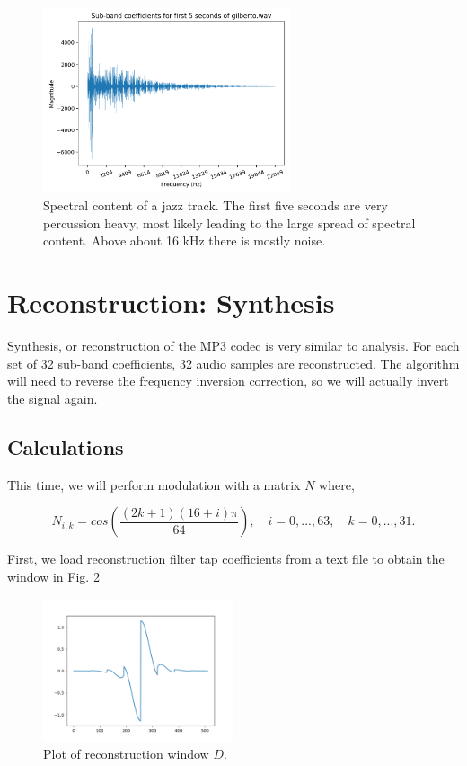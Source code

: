 \documentclass[11pt,a4paper]{article}
\begin{document}
\clearpage

\begin{figure}[ht]
	\centering
	\includegraphics[width=0.65\textwidth]{analysis/gilberto}
	\caption{Spectral content of a jazz track. The first five seconds are very percussion heavy, most likely leading to the large spread of spectral content. Above about 16 kHz there is mostly noise.}
	\label{fig:analysis_gilberto}
\end{figure}

\pagebreak

\section{Reconstruction: Synthesis}
Synthesis, or reconstruction of the MP3 codec is very similar to analysis. For each set of 32 sub-band coefficients, 32 audio samples are reconstructed. The algorithm will need to reverse the frequency inversion correction, so we will actually invert the signal again.

\subsection{Calculations}

This time, we will perform modulation with a matrix $N$ where,

\begin{equation}
N_{i,k} = cos\left(\frac{(2k+1)(16+i)\pi}{64} \right), \quad i = 0,...,63, \quad k=0,...,31.
\end{equation}

First, we load reconstruction filter tap coefficients from a text file to obtain the window in Fig. \ref{fig:d_taps}

\begin{figure}[ht]
	\centering
	\includegraphics[width=0.5\textwidth]{synthesis/d_taps}
	\caption{Plot of reconstruction window $D$.}
	\label{fig:d_taps}
\end{figure}
\end{document}
